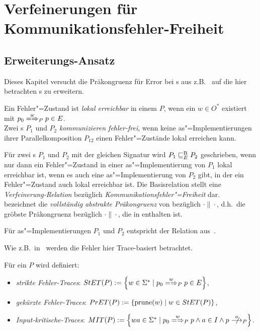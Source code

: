 \chapter{Verfeinerungen für Kommunikationsfehler-Freiheit}

\section{Erweiterungs-Ansatz}

Dieses Kapitel versucht die Präkongruenz für Error bei \EIO{}s aus
z.B.~\cite{Schinko2016BA} auf die hier betrachten \MEIO{}s zu erweitern.

\begin{Def}
  Ein Fehler"=Zustand ist \emph{lokal erreichbar} in einem \MEIO{} $P$, wenn
  ein $w\in O^*$ existiert mit $p_0 \weakmay[w]_{P} p\in E$.\\
  Zwei \MEIO{}s $P_1$ und $P_2$ \emph{kommunizieren fehler-frei}, wenn keine
  as"=Implementierungen ihrer Parallelkomposition $P_{12}$ einen
  Fehler"=Zustände lokal erreichen kann.
\end{Def}

\vspace{0.2cm}

\begin{Def}
  \label{EBRelDef}
  Für zwei \MEIO{}s $P_1$ und $P_2$ mit der gleichen Signatur wird $P_1 \sqsubseteq  _E^\mathrm{B}{}
  P_2$ geschrieben, wenn nur dann ein Fehler"=Zustand in einer
  as"=Implementierung von $P_1$ lokal erreichbar ist, wenn es auch eine
  as"=Implementierung von $P_2$ gibt, in der ein Fehler"=Zustand auch lokal
  erreichbar ist. Die Basisrelation stellt eine \emph{Verfeinerung-Relation}
  bezüglich \emph{Kommunikationsfehler"=Freiheit} dar.\\
  \ECRel{} bezeichnet die \emph{vollständig abstrakte Präkongruenz} von
  \EBRel{} bezüglich $\cdot\|\cdot$, d.h.\ die gröbste Präkongruenz bezüglich
  $\cdot\|\cdot$, die in \EBRel{} enthalten ist.
\end{Def}

Für as"=Implementierungen $P_1$ und $P_2$ entspricht \EBRel{} der Relation
\EBbaRel{} aus~\cite{Schinko2016BA}.

Wie z.B.\ in~\cite{Schinko2016BA} werden die Fehler hier Trace-basiert
betrachtet.

\begin{Def}
  \label{KommTracesDef}
  Für ein \MEIO{} $P$ wird definiert:
  \begin{itemize}
    \item \emph{strikte Fehler-Traces}: $\StET (P) :=
      \left\{w\in\Sigma ^* \mid p_0 \weakmay[w]_P p \in E\right\}$,
    \item \emph{gekürzte Fehler-Traces}: $PrET (P) :=
      \left\{\mathrm{prune} (w) \mid w\in StET (P)\right\}$,
    \item \emph{Input-kritische-Traces}: $\MIT (P) := \left\{wa\in\Sigma ^*
      \mid p_0 \weakmay[w]_P p \land a\in I\land p\nmust[a]_P \right\}$.
  \end{itemize}
\end{Def}

